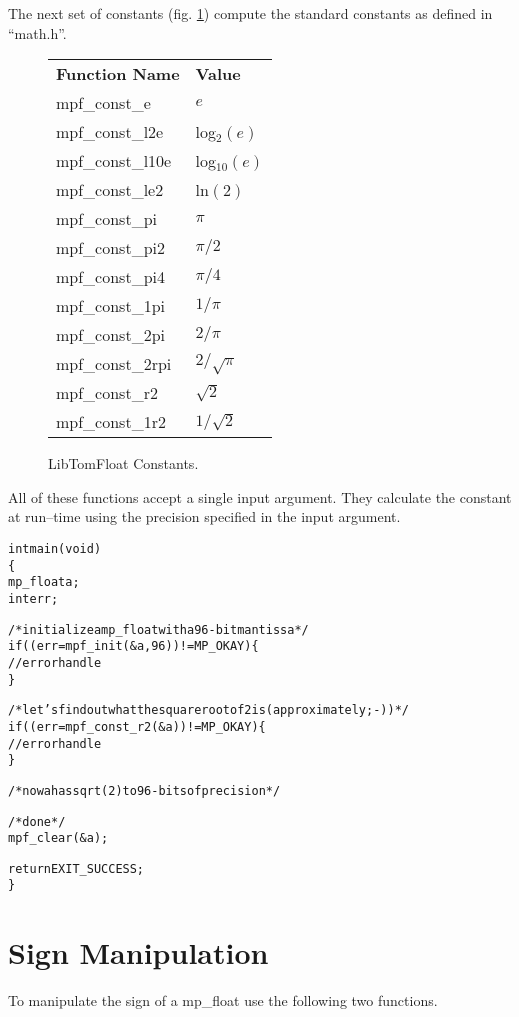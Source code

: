 \documentclass[b5paper]{book}
\begin{document}
The next set of constants (fig. \ref{fig:const}) compute the standard constants as defined in ``math.h''.  
\begin{figure}[here]
\begin{center}
\begin{tabular}{|l|l|}
\hline \textbf{Function Name} & \textbf{Value} \\
mpf\_const\_e & $e$ \\
mpf\_const\_l2e & log$_2(e)$ \\
mpf\_const\_l10e & log$_{10}(e)$ \\
mpf\_const\_le2  & ln$(2)$ \\
mpf\_const\_pi  & $\pi$ \\
mpf\_const\_pi2  & $\pi / 2$ \\
mpf\_const\_pi4  & $\pi / 4$ \\
mpf\_const\_1pi  & $1 / \pi$ \\
mpf\_const\_2pi  & $2 / \pi$ \\
mpf\_const\_2rpi  & $2 / \sqrt{\pi}$ \\
mpf\_const\_r2  & ${\sqrt{2}}$ \\
mpf\_const\_1r2  & $1 / {\sqrt{2}}$ \\
\hline
\end{tabular}
\end{center}
\caption{LibTomFloat Constants.}
\label{fig:const}
\end{figure}

All of these functions accept a single input argument.  They calculate the constant at run--time using the precision specified in the input
argument.  

\begin{alltt}
int main(void)
\{
   mp_float a;
   int err;

   /* initialize a mp_float with a 96-bit mantissa */
   if ((err = mpf_init(&a, 96)) != MP_OKAY) \{
      // error handle
   \}

   /* let's find out what the square root of 2 is (approximately ;-)) */
   if ((err = mpf_const_r2(&a)) != MP_OKAY) \{
      // error handle 
   \}

   /* now a has sqrt(2) to 96-bits of precision */

   /* done */
   mpf_clear(&a);

   return EXIT_SUCCESS;
\}
\end{alltt}

\section{Sign Manipulation}
To manipulate the sign of a mp\_float use the following two functions.
\end{document}

